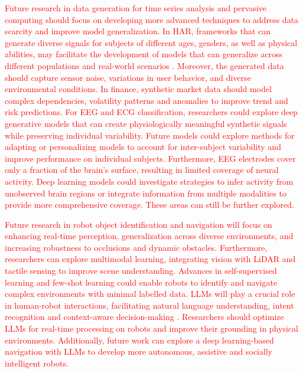 \documentclass[preprint,12pt]{elsarticle}
\begin{document}
\textcolor{red}{Future research in data generation for time series analysis and pervasive computing should focus on developing more advanced techniques to address data scarcity and improve model generalization. In HAR, frameworks that can generate diverse signals for subjects of different ages, genders, as well as physical abilities, may facilitate the development of models that can generalize across different populations and real-world scenarios \citep{jimale_subject_2023}. Moreover, the generated data should capture sensor noise, variations in user behavior, and diverse environmental conditions. In finance, synthetic market data should model complex dependencies, volatility patterns and anomalies to improve trend and risk predictions. For EEG and ECG classification, researchers could explore deep generative models that can create physiologically meaningful synthetic signals while preserving individual variability. Future models could explore methods for adapting or personalizing models to account for inter-subject variability and improve performance on individual subjects. Furthermore, EEG electrodes cover only a fraction of the brain's surface, resulting in limited coverage of neural activity. Deep learning models could investigate strategies to infer activity from unobserved brain regions or integrate information from multiple modalities to provide more comprehensive coverage. These areas can still be further explored.}

\textcolor{red}{Future research in robot object identification and navigation will focus on enhancing real-time perception, generalization across diverse environments, and increasing robustness to occlusions and dynamic obstacles. Furthermore, researchers can explore multimodal learning, integrating vision with LiDAR and tactile sensing to improve scene understanding. Advances in self-supervised learning and few-shot learning could enable robots to identify and navigate complex environments with minimal labelled data. LLMs will play a crucial role in human-robot interactions, facilitating natural language understanding, intent recognition and context-aware decision-making \citep{zhang_large_2023}. Researchers should optimize LLMs for real-time processing on robots and improve their grounding in physical environments. Additionally, future work can explore a deep learning-based navigation with LLMs to develop more autonomous, assistive and socially intelligent robots.}
\end{document}
